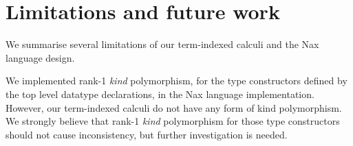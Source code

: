 
\section{Limitations and future work}\label{sec:concl:fw}
We summarise several limitations of our term-indexed calculi and
the Nax language design.

We implemented rank-1 {\it kind} polymorphism, for the type constructors
defined by the top level datatype declarations, in the Nax language
implementation. However, our term-indexed calculi do not have any form of
kind polymorphism. We strongly believe that rank-1 {\it kind} polymorphism
for those type constructors should not cause inconsistency,
but further investigation is needed.

